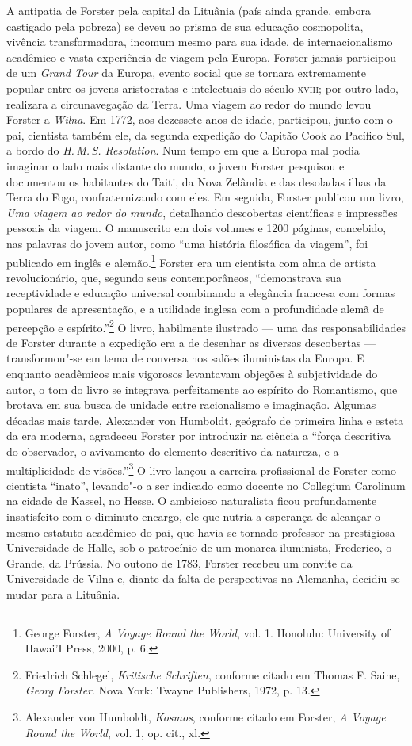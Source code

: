 A antipatia de Forster pela capital da Lituânia (país ainda grande,
embora castigado pela pobreza) se deveu ao prisma de sua educação
cosmopolita, vivência transformadora, incomum mesmo para sua idade, de
internacionalismo acadêmico e vasta experiência de viagem pela Europa.
Forster jamais participou de um \textit{Grand Tour} da Europa, evento
social que se tornara extremamente popular entre os jovens aristocratas
e intelectuais do século \textsc{xviii}; por outro lado, realizara a circunavegação
da Terra. Uma viagem ao redor do mundo levou Forster a \textit{Wilna}. Em 1772,
aos dezessete anos de idade, participou, junto com o pai, cientista
também ele, da segunda expedição do Capitão Cook ao Pacífico Sul, a
bordo do \textit{H.\,M.\,S. Resolution}. Num tempo em que a Europa mal podia
imaginar o lado mais distante do mundo, o jovem Forster pesquisou e
documentou os habitantes do Taiti, da Nova Zelândia e das desoladas
ilhas da Terra do Fogo, confraternizando com eles. Em seguida, Forster
publicou um livro, \textit{Uma viagem ao redor do mundo}, detalhando
descobertas científicas e impressões pessoais da viagem. O manuscrito em
dois volumes e 1200 páginas, concebido, nas palavras do jovem autor,
como ``uma história filosófica da viagem'', foi publicado em inglês e
alemão.\footnote{George Forster, \textit{A Voyage Round the World}, vol. 1. Honolulu: University of Hawai'I Press, 2000, p. 6.}
Forster era um cientista com alma de artista revolucionário, que,
segundo seus contemporâneos, ``demonstrava sua receptividade e educação
universal combinando a elegância francesa com formas populares de
apresentação, e a utilidade inglesa com a profundidade alemã de
percepção e espírito.''\footnote{Friedrich Schlegel, \textit{Kritische Schriften}, conforme citado em Thomas F. Saine, \textit{Georg Forster}. Nova York: Twayne Publishers, 1972, p. 13.} O livro, habilmente ilustrado --- uma das responsabilidades de Forster durante a expedição era
a de desenhar as diversas descobertas --- transformou"-se em tema de
conversa nos salões iluministas da Europa. E enquanto acadêmicos mais
vigorosos levantavam objeções à subjetividade do autor, o tom do livro
se integrava perfeitamente ao espírito do Romantismo, que brotava em sua
busca de unidade entre racionalismo e imaginação. Algumas décadas mais
tarde, Alexander von Humboldt, geógrafo de primeira linha e esteta da
era moderna, agradeceu Forster por introduzir na ciência a ``força
descritiva do observador, o avivamento do elemento descritivo da
natureza, e a multiplicidade de visões.''\footnote{Alexander von Humboldt, \textit{Kosmos}, conforme citado em Forster, \textit{A Voyage Round the World}, vol. 1, op. cit., xl.}
O livro lançou a carreira profissional de Forster como cientista
``inato'', levando"-o a ser indicado como docente no Collegium Carolinum
na cidade de Kassel, no Hesse. O ambicioso naturalista ficou
profundamente insatisfeito com o diminuto encargo, ele que nutria a
esperança de alcançar o mesmo estatuto acadêmico do pai, que havia se
tornado professor na prestigiosa Universidade de Halle, sob o patrocínio
de um monarca iluminista, Frederico, o Grande, da Prússia. No outono de
1783, Forster recebeu um convite da Universidade de Vilna e, diante da
falta de perspectivas na Alemanha, decidiu se mudar para a Lituânia.

